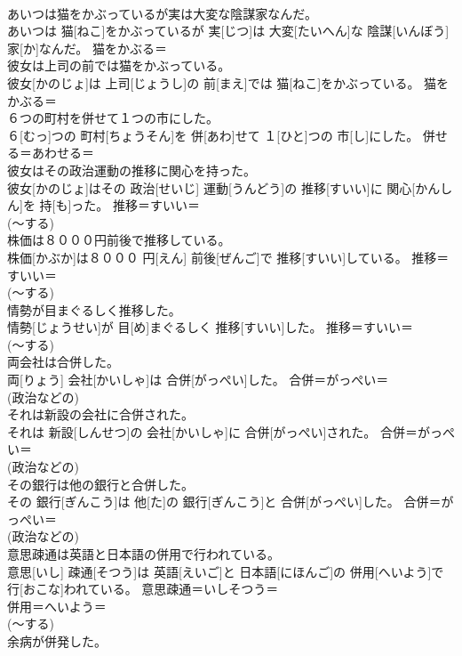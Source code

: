 \documentclass[8pt]{extreport}
\begin{document}
\begin{CJK}{UTF8}{min}
{\\	あいつは猫をかぶっているが実は大変な陰謀家なんだ。	
\\	あいつは 猫[ねこ]をかぶっているが 実[じつ]は 大変[たいへん]な 陰謀[いんぼう] 家[か]なんだ。	猫をかぶる＝ 
\\	彼女は上司の前では猫をかぶっている。	
\\	彼女[かのじょ]は 上司[じょうし]の 前[まえ]では 猫[ねこ]をかぶっている。	猫をかぶる＝ 
\\	６つの町村を併せて１つの市にした。	
\\	６[むっ]つの 町村[ちょうそん]を 併[あわ]せて １[ひと]つの 市[し]にした。	併せる＝あわせる＝ 
\\	彼女はその政治運動の推移に関心を持った。	
\\	彼女[かのじょ]はその 政治[せいじ] 運動[うんどう]の 推移[すいい]に 関心[かんしん]を 持[も]った。	推移＝すいい＝ 
\\	(〜する) 
\\	株価は８０００円前後で推移している。	
\\	株価[かぶか]は８０００ 円[えん] 前後[ぜんご]で 推移[すいい]している。	推移＝すいい＝ 
\\	(〜する) 
\\	情勢が目まぐるしく推移した。	
\\	情勢[じょうせい]が 目[め]まぐるしく 推移[すいい]した。	推移＝すいい＝ 
\\	(〜する) 
\\	両会社は合併した。	
\\	両[りょう] 会社[かいしゃ]は 合併[がっぺい]した。	合併＝がっぺい＝ 
\\	(政治などの) 
\\	それは新設の会社に合併された。	
\\	それは 新設[しんせつ]の 会社[かいしゃ]に 合併[がっぺい]された。	合併＝がっぺい＝ 
\\	(政治などの) 
\\	その銀行は他の銀行と合併した。	
\\	その 銀行[ぎんこう]は 他[た]の 銀行[ぎんこう]と 合併[がっぺい]した。	合併＝がっぺい＝ 
\\	(政治などの) 
\\	意思疎通は英語と日本語の併用で行われている。	
\\	意思[いし] 疎通[そつう]は 英語[えいご]と 日本語[にほんご]の 併用[へいよう]で 行[おこな]われている。	意思疎通＝いしそつう＝ 
\\	併用＝へいよう＝ 
\\	(〜する) 
\\	余病が併発した。	
}
\end{CJK}
\end{document}
